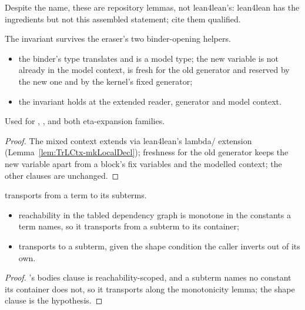 \begin{remark}
 Despite the name, these are repository lemmas, not lean4lean's: lean4lean has the
ingredients but not this assembled statement; cite them qualified.
\end{remark}
\begin{lemma}
\label{lem:BridgeInv-mkLocalDecl}
\leanok
{}
 The invariant survives the eraser's two binder-opening helpers.
\begin{itemize}
\item {} the binder's type translates and is a model type; the new variable is not already
in the model context, is fresh for the old generator and reserved by the new one and by the kernel's
fixed generator;
\item {} the invariant holds at the extended reader, generator and model context.
\end{itemize}
 Used for , , and both eta-expansion families.
\end{lemma}
\begin{proof}
\leanok
{}
 The mixed context extends via lean4lean's lambda/ extension
(Lemma~\ref{lem:TrLCtx-mkLocalDecl}); freshness for the old generator keeps the new variable apart from
a block's fix variables and the modelled context; the other clauses are unchanged.
\end{proof}
\begin{lemma}
\label{lem:Supported-subterm}
\leanok
{}
  transports from a term to its subterms.
\begin{itemize}
\item {} reachability in the tabled dependency graph is monotone in the constants a term
names, so it transports from a subterm to its container;
\item {}  transports to a subterm, given the shape condition the caller
inverts out of its own.
\end{itemize}
\end{lemma}
\begin{proof}
\leanok
{}
 's bodies clause is reachability-scoped, and a subterm names no constant its
container does not, so it transports along the monotonicity lemma; the shape clause is the hypothesis.
\end{proof}


